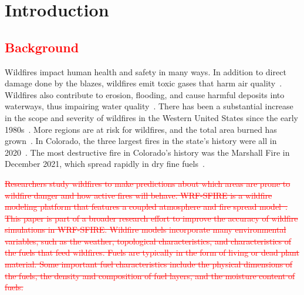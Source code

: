 \documentclass[fire,article,submit,pdftex,moreauthors]{Definitions/mdpi}
\begin{document}


\section{Introduction}
\subsection{\textcolor{red}{Background}}
\label{sec:bg}
Wildfires impact human health and safety in many ways. In addition to direct damage done by the blazes, wildfires emit toxic gases that harm air quality~\citep{WHO-2024-WFS}. Wildfires also contribute to erosion, flooding, and cause harmful deposits into waterways, thus impairing water quality~\citep{USGS-2024-WQA}. There has been a substantial increase in the scope and severity of wildfires in the Western United States since the early 1980s~\citep{Cartier-2022-UFQ}. More regions are at risk for wildfires, and the total area burned has grown~\citep{IPCC-2021-LCI}. In Colorado, the three largest fires in the state's history were all in 2020~\citep{CDFPC-2024-HWI}. The most destructive fire in Colorado's history was the Marshall Fire in December 2021, which spread rapidly in dry fine fuels~\citep{Juliano-2023-TBU}. 

\textcolor{red}{\sout{Researchers study wildfires to make predictions about which areas are prone to wildfire danger and how active fires will behave. WRF-SFIRE is a wildfire modeling platform that features a coupled atmosphere and fire spread model~\citep{Mandel-2014-RAA}. This paper is part of a broader research effort to improve the accuracy of wildfire simulations in WRF-SFIRE. Wildfire models incorporate many environmental variables, such as the weather, topological characteristics, and characteristics of the fuels that feed wildfires. Fuels are typically in the form of living or dead plant material. Some important fuel characteristics include the physical dimensions of the fuels, the density and composition of fuel layers, and the moisture content of fuels.}}
\end{document}
